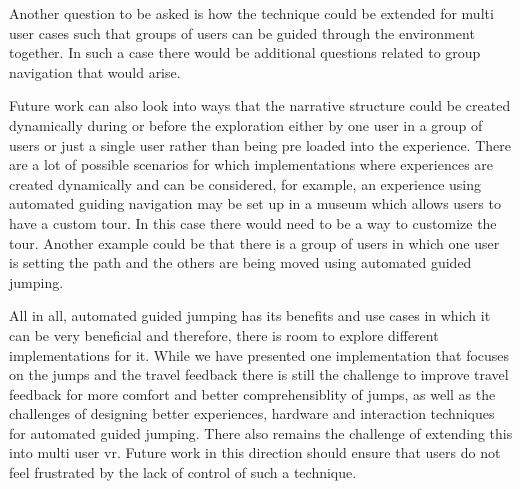 Another question to be asked is how the technique could be extended for multi user cases such that groups of users can be guided through the environment together. In such a case there would be additional questions related to group navigation that would arise.

Future work can also look into ways that the narrative structure could be created dynamically during or before the exploration either by one user in a group of users or just a single user rather than being pre loaded into the experience. There are a lot of possible scenarios for which implementations where experiences are created dynamically and can be considered, for example, an experience using automated guiding navigation may be set up in a museum which allows users to have a custom tour. In this case there would need to be a way to customize the tour. Another example could be that there is a group of users in which one user is setting the path and the others are being moved using automated guided jumping.

All in all, automated guided jumping has its benefits and use cases in which it can be very beneficial and therefore, there is room to explore different implementations for it. While we have presented one implementation that focuses on the jumps and the travel feedback there is still the challenge to improve travel feedback for more comfort and better comprehensiblity of jumps, as well as the challenges of designing better experiences, hardware and interaction techniques for automated guided jumping. There also remains the challenge of extending this into multi user \acrshort{vr}. Future work in this direction should ensure that users do not feel frustrated by the lack of control of such a technique.

 
